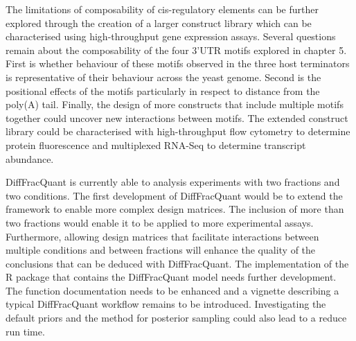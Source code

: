 \documentclass[../main.tex]{subfiles}
\begin{document}
The limitations of composability of cis-regulatory elements can be further explored through the creation of a larger construct library which can be characterised using high-throughput gene expression assays.
Several questions remain about the composability of the four 3'UTR motifs explored in chapter 5.
First is whether behaviour of these motifs observed in the three host terminators is representative of their behaviour across the yeast genome.
Second is the positional effects of the motifs particularly in respect to distance from the poly(A) tail.
Finally, the design of more constructs that include multiple motifs together could uncover new interactions between motifs.
The extended construct library could be characterised with high-throughput flow cytometry to determine protein fluorescence and multiplexed RNA-Seq to determine transcript abundance. 

DiffFracQuant is currently able to analysis experiments with two fractions and two conditions.
The first development of DiffFracQuant would be to extend the framework to enable more complex design matrices.
The inclusion of more than two fractions would enable it to be applied to more experimental assays.
Furthermore, allowing design matrices that facilitate interactions between multiple conditions and between fractions will enhance the quality of the conclusions that can be deduced with DiffFracQuant.
The implementation of the R package that contains the DiffFracQuant model needs further development. 
The function documentation needs to be enhanced and a vignette describing a typical DiffFracQuant workflow remains to be introduced.
Investigating the default priors and the method for posterior sampling could also lead to a reduce run time.
\end{document}
